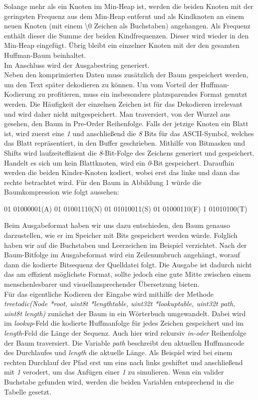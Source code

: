 \documentclass[course=erap]{aspdoc}
\begin{document}
Solange mehr als ein Knoten im Min-Heap ist, werden die beiden Knoten mit der geringsten Frequenz aus dem Min-Heap entfernt und als Kindknoten an einem neuen Knoten (mit einem \textbackslash 0 Zeichen als Buchstaben) angehangen. Als Frequenz enthält dieser die Summe der beiden Kindfrequenzen. Dieser wird wieder in den Min-Heap eingefügt.
Übrig bleibt ein einzelner Knoten mit der den gesamten Huffman-Baum beinhaltet.\\
Im Anschluss wird der Ausgabestring generiert.\\
Neben den komprimierten Daten muss zusätzlich der Baum gespeichert werden, um den Text später dekodieren zu können. Um vom Vorteil der Huffman-Kodierung zu profitieren, muss ein insbesondere platzsparendes Format genutzt werden. Die Häufigkeit der einzelnen Zeichen ist für das Dekodieren irrelevant und wird daher nicht mitgespeichert.
Man traversiert, von der Wurzel aus gesehen, den Baum in Pre-Order Reihenfolge. Falls der jetzige Knoten ein Blatt ist, wird zuerst eine \textit{1} und anschließend die \textit{8} Bits für das ASCII-Symbol, welches das Blatt repräsentiert, in den Buffer geschrieben. Mithilfe von Bitmasken und Shifts wird laufzeiteffizient die \textit{8}-Bit-Folge des Zeichens generiert und gespeichert. Handelt es sich um kein Blattknoten, wird ein \textit{0}-Bit gespeichert. Daraufhin werden die beiden Kinder-Knoten kodiert, wobei erst das linke und dann das rechte betrachtet wird.
Für den Baum in Abbildung 1 würde die Baumkompression wie folgt aussehen:
\begin{center}
    01 01000001(A) 01 01001110(N) 01 01010011(S) 01 01000110(F) 1 01010100(T)
\end{center}
Beim Ausgabeformat haben wir uns dazu entschieden, den Baum genauso darzustellen, wie er im Speicher mit Bits gespeichert werden würde. Folglich haben wir auf die Buchstaben und Leerzeichen im Beispiel verzichtet. Nach der Baum-Bitfolge im Ausgabeformat wird ein Zeilenumbruch angehängt, worauf dann die kodierte Bitsequenz der Quelldatei folgt. Die Ausgabe ist dadurch nicht das am effizient möglichste Format, sollte jedoch eine gute Mitte zwischen einem menschenlesbarer und visuellansprechender Übersetzung bieten.\\
Für das eigentliche Kodieren der Eingabe wird mithilfe der Methode \textit{tree\textunderscore to\textunderscore dic(Node *root, uint8\textunderscore t *length\textunderscore table, uint32\textunderscore t *lookup\textunderscore table, uint32\textunderscore t path, uint8\textunderscore t length)} zunächst der Baum in ein Wörterbuch umgewandelt. Dabei wird im \textit{lookup}-Feld die kodierte Huffmanfolge für jedes Zeichen gespeichert und im \textit{length}-Feld die Länge der Sequenz. Auch hier wird rekursiv \textit{in-oder} Reihenfolge der Baum traversiert. Die Variable \textit{path} beschreibt den aktuellen Huffmancode des Durchlaufes und \textit{length} die aktuelle Länge. Als Beispiel wird bei einem rechten Durchlauf der Pfad erst um eins nach links geshiftet und anschließend mit \textit{1} verodert, um das Anfügen einer \textit{1} zu simulieren. Wenn ein valider Buchstabe gefunden wird, werden die beiden Variablen entsprechend in die Tabelle gesetzt.\\
\end{document}
